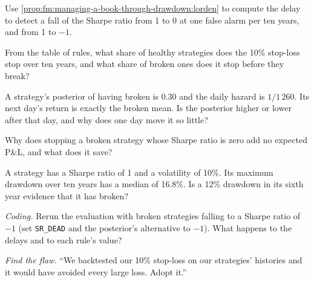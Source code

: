 \begin{exercise}[$\star$]\label{exo:fm:managing-a-book-through-drawdown:2}
Use \cref{prop:fm:managing-a-book-through-drawdown:lorden} to compute the delay to detect a fall of the Sharpe ratio from 1 to 0 at one false alarm
per ten years, and from 1 to $-1$.
\end{exercise}

\begin{exercise}[$\star$]\label{exo:fm:managing-a-book-through-drawdown:3}
From the table of rules, what share of healthy strategies does the 10\% stop-loss stop over ten years, and what share of broken ones does it stop
before they break?
\end{exercise}

\begin{exercise}[$\star\star$]\label{exo:fm:managing-a-book-through-drawdown:4}
A strategy's posterior of having broken is 0.30 and the daily hazard is $1/1\,260$. Its next day's return is exactly the broken mean. Is the
posterior higher or lower after that day, and why does one day move it so little?
\end{exercise}

\begin{exercise}[$\star\star$]\label{exo:fm:managing-a-book-through-drawdown:5}
Why does stopping a broken strategy whose Sharpe ratio is zero add no expected P\&L, and what does it save?
\end{exercise}

\begin{exercise}[$\star\star$]\label{exo:fm:managing-a-book-through-drawdown:6}
A strategy has a Sharpe ratio of 1 and a volatility of 10\%. Its maximum drawdown over ten years has a median of 16.8\%. Is a 12\% drawdown in its
sixth year evidence that it has broken?
\end{exercise}

\begin{exercise}[$\star\star\star$]\label{exo:fm:managing-a-book-through-drawdown:7}
\emph{Coding.} Rerun the evaluation with broken strategies falling to a Sharpe ratio of $-1$ (set \texttt{SR\_DEAD} and the posterior's
alternative to $-1$). What happens to the delays and to each rule's value?
\end{exercise}

\begin{exercise}[$\star\star\star$]\label{exo:fm:managing-a-book-through-drawdown:8}
\emph{Find the flaw.} ``We backtested our 10\% stop-loss on our strategies' histories and it would have avoided every large loss. Adopt it.''
\end{exercise}

